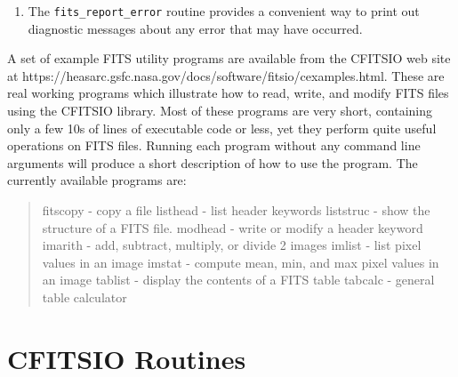 \documentclass[11pt]{article}
\begin{document}
\begin{enumerate}
All of the CFITSIO routines which read or write header keywords,
image data, or table data operate only within the currently opened
HDU in the file. To read or write information in a different HDU you must
first explicitly move to that HDU (see the {\tt fits\_movabs\_hdu} and
{\tt fits\_movrel\_hdu} routines in section 4.3).

\item

The {\tt fits\_report\_error} routine provides a convenient way to print out
diagnostic messages about any error that may have occurred. 

\end{enumerate}

A set of example FITS utility programs are  available from the CFITSIO
web site at \newline
https://heasarc.gsfc.nasa.gov/docs/software/fitsio/cexamples.html.
These are real working programs which illustrate how to read, write,
and modify FITS files using the CFITSIO library.  Most of these
programs are very short, containing only a few 10s of lines of
executable code or less, yet they perform quite useful operations on
FITS files. Running each program without any command line arguments
will produce a short description of how to use the program.
The currently available programs are:
\begin{quote}
fitscopy - copy a file
\newline
listhead - list header keywords
\newline
liststruc - show the structure of a FITS file.
\newline
modhead  - write or modify a header keyword
\newline
imarith  - add, subtract, multiply, or divide 2 images
\newline
imlist  - list pixel values in an image
\newline
imstat  - compute mean, min, and max pixel values in an image
\newline
tablist - display the contents of a FITS table
\newline
tabcalc  - general table calculator
\end{quote}

\newpage

\section{CFITSIO Routines}
\end{document}
